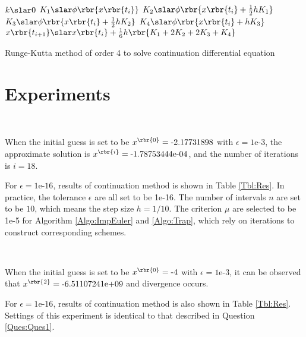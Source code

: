 \documentclass[english, nochinese]{pkupaper}
\begin{document}
\begin{algorithm}
\SetAlgoLined


\BlankLine

{
    $ k \slar 0 $\;
    $ K_1 \slar \phi \rbr{ x \rbr{t_i} } $\;
    $ K_2 \slar \phi \rbr{ x \rbr{t_i} + \frac{1}{2} h K_1 } $\;
    $ K_3 \slar \phi \rbr{ x \rbr{t_i} + \frac{1}{2} h K_2 } $\;
    $ K_4 \slar \phi \rbr{ x \rbr{t_i} + h K_3 } $\;
    $ x \rbr{t_{ i + 1 }} \slar x \rbr{t_i} + \frac{1}{6} h \rbr{ K_1 + 2 K_2 + 2 K_3 + K_4 } $\;
}


\BlankLine

\caption{Runge-Kutta method of order 4 to solve continuation differential equation}
\label{Algo:RK4}
\end{algorithm}

\section{Experiments}

\begin{thmquestion} \label{Ques:Ques1}
\ 
\begin{thmanswer}
When the initial guess is set to be $ x^{\rbr{0}} = \text{-2.17731898} $ with $ \epsilon = \text{1e-3} $, the approximate solution is $ x^{\rbr{i}} = \text{-1.78753444e-04} $, and the number of iterations is $ i = 18 $.

For $ \epsilon = \text{1e-16} $, results of continuation method is shown in Table \ref{Tbl:Res}. In practice, the tolerance $\epsilon$ are all set to be 1e-16. The number of intervals $n$ are set to be $10$, which means the step size $ h = 1 / 10 $. The criterion $\mu$ are selected to be 1e-5 for Algorithm \ref{Algo:ImpEuler} and \ref{Algo:Trap}, which rely on iterations to construct corresponding schemes. 
\end{thmanswer}
\end{thmquestion}

\begin{thmquestion}
\ 
\begin{thmanswer}
When the initial guess is set to be $ x^{\rbr{0}} = \text{-4} $ with $ \epsilon = \text{1e-3} $, it can be observed that $ x^{\rbr{2}} = \text{-6.51107241e+09} $ and divergence occurs.

For $ \epsilon = \text{1e-16} $, results of continuation method is also shown in Table \ref{Tbl:Res}. Settings of this experiment is identical to that described in Question \ref{Ques:Ques1}.
\end{thmanswer}
\end{thmquestion}
\end{document}
